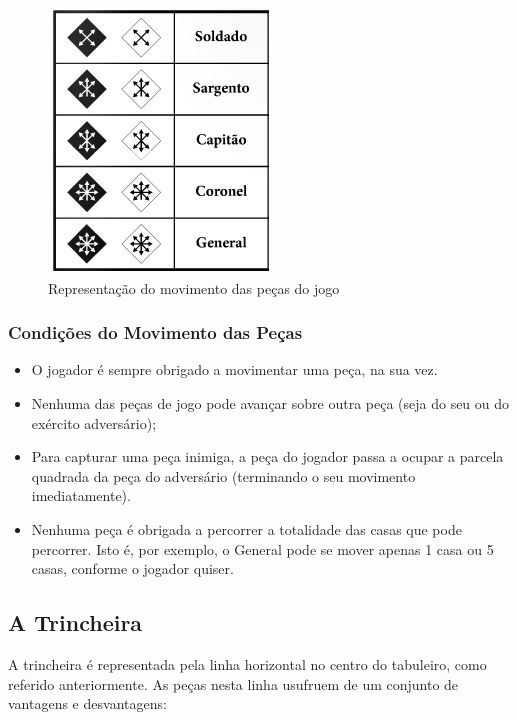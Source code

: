 \documentclass[a4paper]{article}
\begin{document}
\begin{figure}[h!]
\begin{center}
\includegraphics[scale=0.5]{img/pieces-movement.jpg}
\caption{Representação do movimento das peças do jogo}
\label{fig:5}
\end{center}
\end{figure}

\subsubsection{Condições do Movimento das Peças}

\begin{itemize}
	\item O jogador é sempre obrigado a movimentar uma peça, na sua vez.
	\item Nenhuma das peças de jogo pode avançar sobre outra peça (seja do seu ou do exército adversário);
	\item Para capturar uma peça inimiga, a peça do jogador passa a ocupar a parcela quadrada da peça do adversário (terminando o seu movimento imediatamente).
	\item Nenhuma peça é obrigada a percorrer a totalidade das casas que pode percorrer. Isto é, por exemplo, o General pode se mover apenas 1 casa ou 5 casas, conforme o jogador quiser.
\end{itemize}

\newpage

\subsection{A Trincheira}

A trincheira é representada pela linha horizontal no centro do tabuleiro, como referido anteriormente. As peças nesta linha usufruem de um conjunto de vantagens e desvantagens: 
\end{document}
